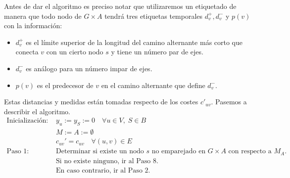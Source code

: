 \documentclass[twoside,a4paper,openright,12pt]{book}
\begin{document}
Antes de dar el algoritmo es preciso notar que utilizaremos un etiquetado de manera que todo nodo de $G\times A$ tendrá tres etiquetas temporales $d_v^+,d_v^-$ y $p(v)$ con la información:
\begin{itemize}
\item $d_v^+$ es el límite superior de la longitud del camino alternante más corto que conecta $v$ con un cierto nodo $s$ y tiene un número par de ejes.
\item $d_v^-$ es análogo para un número impar de ejes.
\item $p(v)$ es el predecesor de $v$ en el camino alternante que define $d_v^-$. 
\end{itemize}
Estas distancias y medidas están tomadas respecto de los costes $c'_{uv}$. Pasemos a describir el algoritmo.
\begin{align*}
\text{Inicialización: }& y_u:= y_S:= 0 \quad \forall u \in V,\; S\in B\\
& M:=A:=\emptyset\\
& c_{uv}' = c_{uv} \quad \forall (u,v)\in E\\
\text{Paso 1: }& \text{Determinar si existe un nodo $s$ no emparejado en $G\times A$ con respecto a $M_A$.}\\
&\text{Si no existe ninguno, ir al Paso 8.}\\
&\text{En caso contrario, ir al Paso 2.}
\end{align*}
\end{document}
